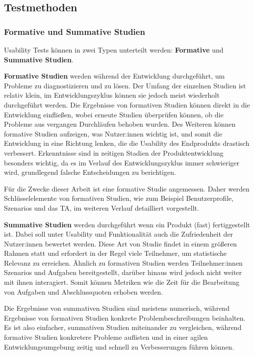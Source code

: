 
\subsection{Testmethoden}

\subsubsection{Formative und Summative Studien}
\label{sec:formative-summative}
Usability Tests können in zwei Typen unterteilt werden: \textbf{Formative} und \textbf{Summative
  Studien}.

\textbf{Formative Studien} werden während der Entwicklung durchgeführt, um Probleme zu diagnostizieren und zu lösen. Der Umfang der einzelnen Studien ist relativ klein, im Entwicklungszyklus können sie jedoch meist wiederholt durchgeführt werden. Die Ergebnisse von formativen Studien können direkt in die Entwicklung einfließen, wobei erneute Studien überprüfen können, ob die Probleme aus vergangen Durchläufen behoben wurden. Des Weiteren können formative Studien aufzeigen, was Nutzer:innen wichtig ist, und somit die Entwicklung in eine Richtung lenken, die die Usability des Endprodukts drastisch verbessert. Erkenntnisse sind in zeitigen Stadien der Produktentwicklung besonders wichtig, da es im Verlauf des Entwicklungszyklus immer schwieriger wird, grundlegend falsche Entscheidungen zu berichtigen.

Für die Zwecke dieser Arbeit ist eine formative Studie angemessen. Daher werden Schlüsselelemente von formativen Studien, wie zum Beispiel Benutzerprofile, Szenarios und das \acl{TA}, im weiteren Verlauf detailliert vorgestellt.

\textbf{Summative Studien} werden durchgeführt wenn ein Produkt (fast) fertiggestellt ist. Dabei soll unter Usability und Funktionalität auch die Zufriedenheit der Nutzer:innen bewertet werden. Diese Art von Studie findet in einem größeren Rahmen statt und erfordert in der Regel viele Teilnehmer, um statistische Relevanz zu erreichen. Ähnlich zu formativen Studien werden Teilnehmer:innen Szenarios und Aufgaben bereitgestellt, darüber hinaus wird jedoch nicht weiter mit ihnen interagiert. Somit können Metriken wie die Zeit für die Bearbeitung von Aufgaben und Abschlussquoten erhoben werden.

Die Ergebnisse von summativen Studien sind meistens numerisch, während Ergebnisse von formativen Studien konkrete Problembeschreibungen beinhalten. Es ist also einfacher, summativen Studien miteinander zu vergleichen, während formative Studien konkretere Probleme auflisten und in einer agilen Entwicklungsumgebung zeitig und schnell zu Verbesserungen führen können.

